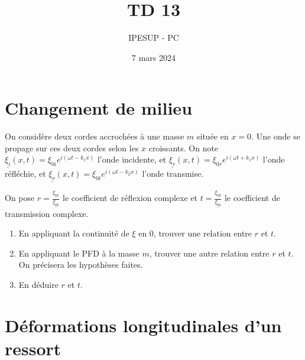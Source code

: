 \documentclass{article}
\title{TD 13 }
\author{IPESUP - PC }
\date{7 mars 2024}
\begin{document}
\maketitle



\section{Changement de milieu }

On considère deux cordes accrochées à une masse $m$ située en $x=0$.
Une onde se propage sur ces deux cordes selon les $x$ croissants. 
On note $\underline{\xi_i}(x,t) = \xi_{0 i} e^{i(\omega t - k_1 x)}$ l'onde incidente,
et $\underline{\xi_r}(x,t) = \xi_{0 r} e^{i(\omega t + k_1 x)}$ l'onde réfléchie, 
et $\underline{\xi_r}(x,t) = \xi_{0 t} e^{i(\omega t - k_2 x)}$ l'onde transmise.

On pose $r=\frac{\underline{\xi_{0r}}}{\underline{\xi_{0i}}}$ le coefficient de réflexion complexe et 
$t=\frac{\underline{\xi_{0t}}}{\underline{\xi_{0i}}}$ le coefficient de transmission complexe.
\begin{enumerate}
  \item En appliquant la continuité de $\xi$ en 0, trouver une relation entre $r$ et $t$.
  \item En appliquant le PFD à la masse $m$, trouver une autre relation entre $r$ et $t$. On précisera les hypothèses faites. 
  \item En déduire $r$ et $t$.
\end{enumerate}


\section{Déformations longitudinales d'un ressort}
\end{document}

